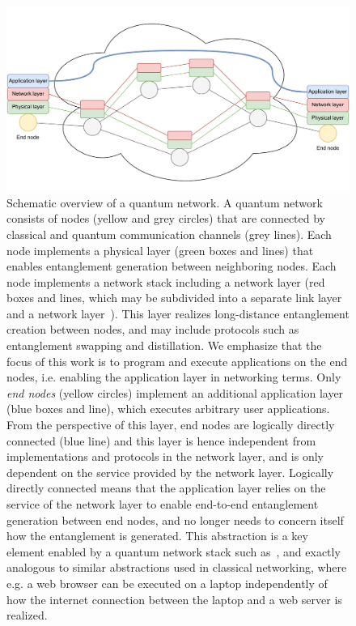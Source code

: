\begin{figure}[t]
    \centering
    \includegraphics[width=0.8\linewidth]{figures/background/network_nodes.pdf}
    \caption{
        Schematic overview of a quantum network.
        A quantum network consists of nodes (yellow and grey circles) that are connected by classical and quantum communication channels (grey lines).
        Each node implements a physical layer (green boxes and lines) that enables entanglement generation between neighboring nodes.
        Each node implements a network stack including a network layer (red boxes and lines, which may be subdivided into a separate link layer and a network layer~\cite{dahlberg_2019_egp, kozlowski_2019_towards}).
        This layer realizes long-distance entanglement creation between nodes, and may include protocols such as entanglement swapping and distillation.
        \newline
        We emphasize that the focus of this work is to program and execute applications on the end nodes, i.e. enabling the application layer in networking terms.
        Only \emph{end nodes} (yellow circles) implement an additional application layer (blue boxes and line), which executes arbitrary user applications.
        From the perspective of this layer, end nodes are logically directly connected (blue line) and this layer is hence independent from implementations and protocols in the network layer, and is only dependent on the service  provided by the network layer.
        Logically directly connected means that the application layer relies on the service of the network layer to enable end-to-end entanglement generation between end nodes, and no longer needs to concern itself how the entanglement is generated.
        This abstraction is a key element enabled by a quantum network stack such as~\cite{dahlberg_2019_egp}, and exactly analogous to similar abstractions used in classical networking, where e.g. a web browser can be executed on a laptop independently of how the internet connection between the laptop and a web server is realized.
    }
    \label{fig:network_model}
\end{figure}

